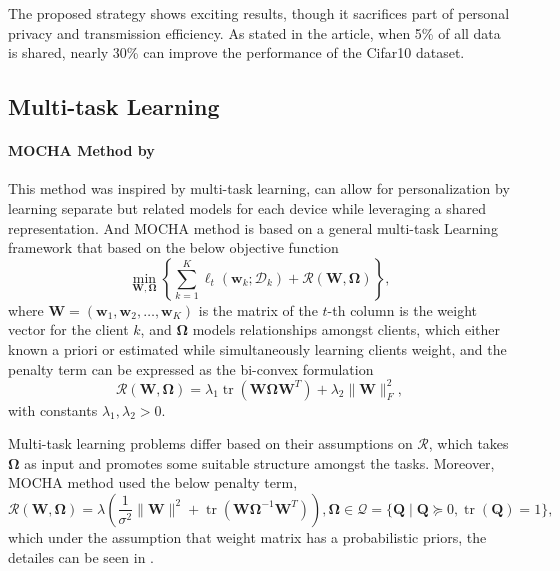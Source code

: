 \documentclass[a4paper,12pt,authoryear]{elegantpaper}
\begin{document}
The proposed strategy shows exciting results, though it sacrifices part of personal privacy and transmission efficiency. As stated in the article, when 5\% of all data is shared, nearly 30\% can improve the performance of the Cifar10 dataset.

\subsection{Multi-task Learning}

\paragraph{MOCHA Method by \cite{smith_federated_2017}}

This method was inspired by multi-task learning, can allow for personalization by learning separate but related models for each device while leveraging a shared representation. And MOCHA method is based on a general multi-task Learning framework that based on the below objective function
\begin{equation}
    \min_{\mathbf{W},\mathbf{\Omega}}\left\{\sum_{k=1}^{K}\ell_{t}\left(\mathbf{w}_{k};\mathcal{D}_{k}\right)+\mathcal{R}(\mathbf{W},\mathbf{\Omega})\right\},
\end{equation}
where $\mathbf{W}=(\mathbf{w}_{1},\mathbf{w}_{2},\ldots,\mathbf{w}_{K})$ is the matrix of the $t$-th column is the weight vector for the client $k$, and $\mathbf{\Omega}$ models relationships amongst clients, which either known a priori or estimated while simultaneously learning clients weight, and the penalty term can be expressed as the bi-convex formulation
\begin{equation}
    \mathcal{R}(\mathbf{W},\mathbf{\Omega})=\lambda_{1}\operatorname{tr}\left(\mathbf{W}\mathbf{\Omega}\mathbf{W}^{T}\right)+\lambda_{2}\|\mathbf{W}\|_{F}^{2},
\end{equation}
with constants $\lambda_{1},\lambda_{2}>0$.

Multi-task learning problems differ based on their assumptions on $\mathcal{R}$, which takes $\mathbf{\Omega}$ as input and promotes some suitable structure amongst the tasks. Moreover, MOCHA method used the below penalty term,
\begin{equation}
    \mathcal{R}(\mathbf{W},\mathbf{\Omega})=\lambda\left(\frac{1}{\sigma^{2}}\|\mathbf{W}\|^{2}+\operatorname{tr}\left(\mathbf{W}\mathbf{\Omega}^{-1}\mathbf{W}^{T}\right)\right),\mathbf{\Omega}\in\mathcal{Q}=\{\mathbf{Q}\mid\mathbf{Q}\succeq 0,\operatorname{tr}(\mathbf{Q})=1\},
\end{equation}
which under the assumption that weight matrix has a probabilistic priors, the detailes can be seen in \cite{zhang_convex_2010}.
\end{document}

